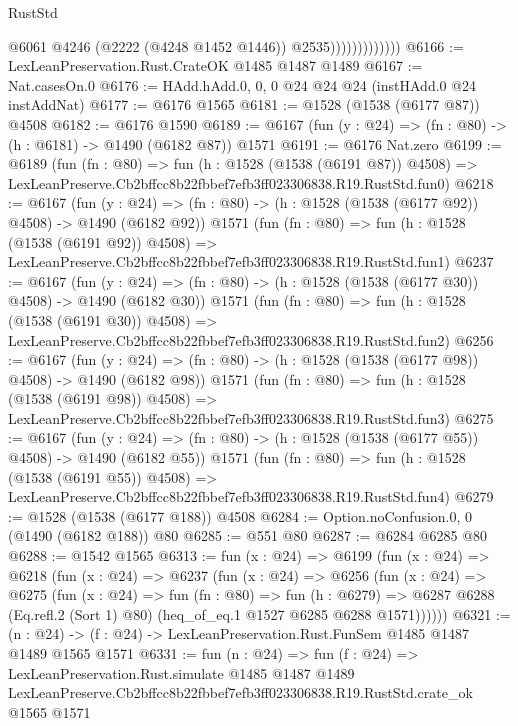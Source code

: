 \begin{lexlean}{RustStd}
\begin{coremodule}
                              @6061
                              @4246
                              (@2222 (@4248 @1452 @1446))
                              @2535)))))))))))))
@6166 := LexLeanPreservation.Rust.CrateOK @1485 @1487 @1489
@6167 := Nat.casesOn.{0}
@6176 := HAdd.hAdd.{0, 0, 0} @24 @24 @24 (instHAdd.{0} @24 instAddNat)
@6177 := @6176 @1565
@6181 := @1528 (@1538 (@6177 @87)) @4508
@6182 := @6176 @1590
@6189 := @6167 (fun (y : @24) => (fn : @80) -> (h : @6181) -> @1490 (@6182 @87)) @1571
@6191 := @6176 Nat.zero
@6199 := @6189
    (fun (fn : @80) =>
    fun (h : @1528 (@1538 (@6191 @87)) @4508) =>
    LexLeanPreserve.Cb2bffcc8b22fbbef7efb3ff023306838.R19.RustStd.fun0)
@6218 := @6167
    (fun (y : @24) => (fn : @80) -> (h : @1528 (@1538 (@6177 @92)) @4508) -> @1490 (@6182 @92))
    @1571
    (fun (fn : @80) =>
    fun (h : @1528 (@1538 (@6191 @92)) @4508) =>
    LexLeanPreserve.Cb2bffcc8b22fbbef7efb3ff023306838.R19.RustStd.fun1)
@6237 := @6167
    (fun (y : @24) => (fn : @80) -> (h : @1528 (@1538 (@6177 @30)) @4508) -> @1490 (@6182 @30))
    @1571
    (fun (fn : @80) =>
    fun (h : @1528 (@1538 (@6191 @30)) @4508) =>
    LexLeanPreserve.Cb2bffcc8b22fbbef7efb3ff023306838.R19.RustStd.fun2)
@6256 := @6167
    (fun (y : @24) => (fn : @80) -> (h : @1528 (@1538 (@6177 @98)) @4508) -> @1490 (@6182 @98))
    @1571
    (fun (fn : @80) =>
    fun (h : @1528 (@1538 (@6191 @98)) @4508) =>
    LexLeanPreserve.Cb2bffcc8b22fbbef7efb3ff023306838.R19.RustStd.fun3)
@6275 := @6167
    (fun (y : @24) => (fn : @80) -> (h : @1528 (@1538 (@6177 @55)) @4508) -> @1490 (@6182 @55))
    @1571
    (fun (fn : @80) =>
    fun (h : @1528 (@1538 (@6191 @55)) @4508) =>
    LexLeanPreserve.Cb2bffcc8b22fbbef7efb3ff023306838.R19.RustStd.fun4)
@6279 := @1528 (@1538 (@6177 @188)) @4508
@6284 := Option.noConfusion.{0, 0} (@1490 (@6182 @188)) @80
@6285 := @551 @80
@6287 := @6284 @6285 @80
@6288 := @1542 @1565
@6313 := fun (x : @24) =>
  @6199
    (fun (x : @24) =>
    @6218
      (fun (x : @24) =>
      @6237
        (fun (x : @24) =>
        @6256
          (fun (x : @24) =>
          @6275
            (fun (x : @24) =>
            fun (fn : @80) =>
            fun (h : @6279) =>
            @6287 @6288 (Eq.refl.{2} (Sort 1) @80) (heq_of_eq.{1} @1527 @6285 @6288 @1571))))))
@6321 := (n : @24) -> (f : @24) -> LexLeanPreservation.Rust.FunSem @1485 @1487 @1489 @1565 @1571
@6331 := fun (n : @24) =>
  fun (f : @24) =>
  LexLeanPreservation.Rust.simulate
    @1485
    @1487
    @1489
    LexLeanPreserve.Cb2bffcc8b22fbbef7efb3ff023306838.R19.RustStd.crate_ok
    @1565
    @1571
\end{coremodule}
\end{lexlean}
